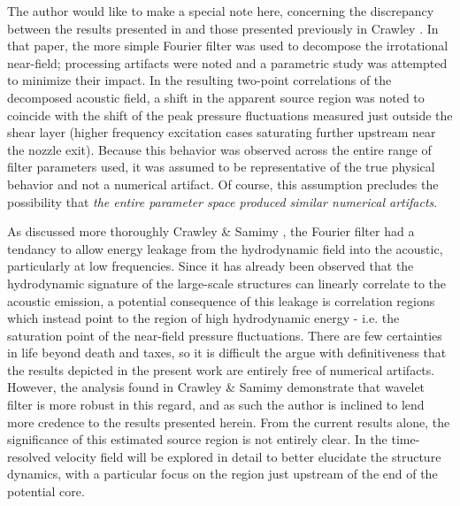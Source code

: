 The author would like to make a special note here, concerning the discrepancy between the results presented in  and those presented previously in Crawley \etal \citep{Crawley2015}.
In that paper, the more simple Fourier filter was used to decompose the irrotational near-field; processing artifacts were noted and a parametric study was attempted to minimize their impact.
In the resulting two-point correlations of the decomposed acoustic field, a shift in the apparent source region was noted to coincide with the shift of the peak pressure fluctuations measured just outside the shear layer (higher frequency excitation cases saturating further upstream near the nozzle exit).
Because this behavior was observed across the entire range of filter parameters used, it was assumed to be representative of the true physical behavior and not a numerical artifact.
Of course, this assumption precludes the possibility that \textit{the entire parameter space produced similar numerical artifacts}. 

As discussed more thoroughly Crawley \& Samimy \citep{Crawley2016}, the Fourier filter had a tendancy to allow energy leakage from the hydrodynamic field into the acoustic, particularly at low frequencies. 
Since it has already been observed that the hydrodynamic signature of the large-scale structures can linearly correlate to the acoustic emission, a potential consequence of this leakage is correlation regions which instead point to the region of high hydrodynamic energy - i.e. the saturation point of the near-field pressure fluctuations.
There are few certainties in life beyond death and taxes, so it is difficult the argue with definitiveness that the results depicted in the present work are entirely free of numerical artifacts.
However, the analysis found in Crawley \& Samimy \citep{Crawley2016} demonstrate that wavelet filter is more robust in this regard, and as such the author is inclined to lend more credence to the results presented herein. 
From the current results alone, the significance of this estimated source region is not entirely clear.
In  the time-resolved velocity field will be explored in detail to better elucidate the structure dynamics, with a particular focus on the region just upstream of the end of the potential core.